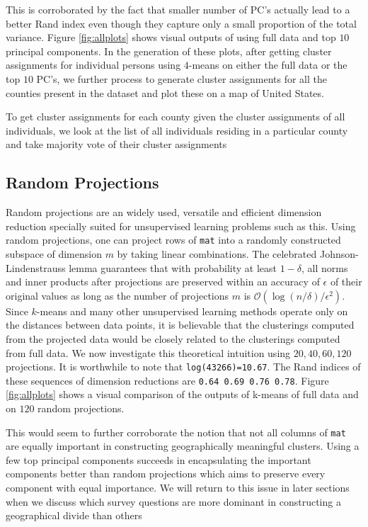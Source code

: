 This is corroborated by the fact that smaller number of PC's actually lead to a better Rand index even though they capture only a small proportion of the total variance. Figure \ref{fig:allplots} shows visual outputs of using full data and top $10$ principal components. In the generation of these plots, after getting cluster assignments for individual persons using $4$-means on either the full data or the top $10$ PC's, we further process to generate cluster assignments for all the counties present in the dataset and plot these on a map of United States.
\begin{center}
To get cluster assignments for each county given the cluster assignments of all individuals, we look at the list of all individuals residing in a particular county and take majority vote of their cluster assignments
\end{center}


\subsection{Random Projections}

Random projections are an widely used, versatile and efficient dimension reduction specially suited for unsupervised learning problems such as this. Using random projections, one can project rows of \verb|mat| into a randomly constructed subspace of dimension $m$ by taking linear combinations. The celebrated Johnson-Lindenstrauss lemma guarantees that with probability at least $1-\delta$, all norms and inner products after projections are preserved within an accuracy of $\epsilon$ of their original values as long as the number of projections $m$ is $\mathcal{O}(\log(n/\delta)/\epsilon^2)$. Since $k$-means and many other unsupervised learning methods operate only on the distances between data points, it is believable that the clusterings computed from the projected data would be closely related to the clusterings computed from full data. We now investigate this theoretical intuition using $20,40,60,120$ projections. It is worthwhile to note that \verb|log(43266)=10.67|. The Rand indices of these sequences of dimension reductions are \verb|0.64 0.69 0.76 0.78|. Figure \ref{fig:allplots} shows a visual comparison of the outputs of k-means of full data and on $120$ random projections.

\begin{center}
This would seem to further corroborate the notion that not all columns of \verb|mat| are equally important in constructing geographically meaningful clusters. Using a few top principal components succeeds in encapsulating the important components better than random projections which aims to preserve every component with equal importance. We will return to this issue in later sections when we discuss which survey questions are more dominant in constructing a geographical divide than others
\end{center}

